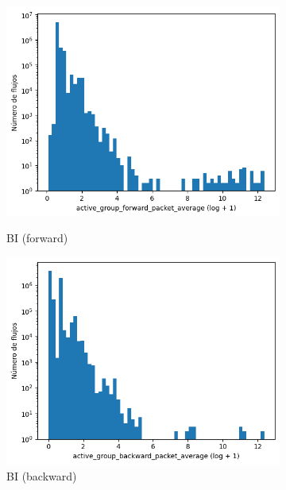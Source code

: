 \begin{figure}[H]
\begin{subfigure}[b]{0.26\textwidth}
        \includegraphics[width=\linewidth]{media/packet_pincer_botiot/active_group_forward_packet_average_log_x_log_y.png}
        \caption{BI (forward)}
        \includegraphics[width=\linewidth]{media/packet_pincer_botiot/active_group_backward_packet_average_log_x_log_y.png}
        \caption{BI (backward)}
    \end{subfigure}
    \hfill
    \begin{subfigure}[b]{0.26\textwidth}
        \centering

\end{subfigure}
\end{figure}

